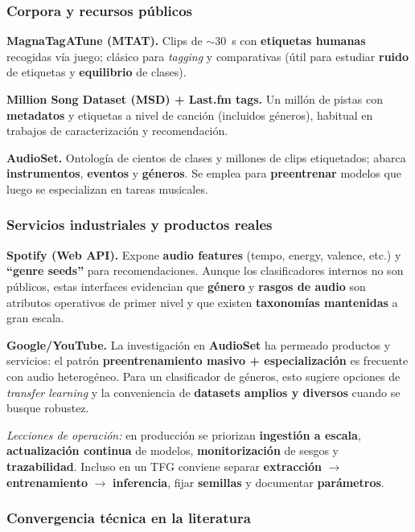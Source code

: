 \documentclass[12pt,twoside]{article}
\begin{document}
\subsubsection{Corpora y recursos públicos}

\textbf{MagnaTagATune (MTAT).} Clips de $\sim$30~s con \textbf{etiquetas humanas} recogidas vía juego; clásico para \emph{tagging} y comparativas (útil para estudiar \textbf{ruido} de etiquetas y \textbf{equilibrio} de clases).

\textbf{Million Song Dataset (MSD) + Last.fm tags.} Un millón de pistas con \textbf{metadatos} y etiquetas a nivel de canción (incluidos géneros), habitual en trabajos de caracterización y recomendación.

\textbf{AudioSet.} Ontología de cientos de clases y millones de clips etiquetados; abarca \textbf{instrumentos}, \textbf{eventos} y \textbf{géneros}. Se emplea para \textbf{preentrenar} modelos que luego se especializan en tareas musicales.

\subsubsection{Servicios industriales y productos reales}

\textbf{Spotify (Web API).} Expone \textbf{audio features} (tempo, energy, valence, etc.) y \textbf{``genre seeds''} para recomendaciones. Aunque los clasificadores internos no son públicos, estas interfaces evidencian que \textbf{género} y \textbf{rasgos de audio} son atributos operativos de primer nivel y que existen \textbf{taxonomías mantenidas} a gran escala.

\textbf{Google/YouTube.} La investigación en \textbf{AudioSet} ha permeado productos y servicios: el patrón \textbf{preentrenamiento masivo + especialización} es frecuente con audio heterogéneo. Para un clasificador de géneros, esto sugiere opciones de \emph{transfer learning} y la conveniencia de \textbf{datasets amplios y diversos} cuando se busque robustez.

\medskip
\noindent\textit{Lecciones de operación:} en producción se priorizan \textbf{ingestión a escala}, \textbf{actualización continua} de modelos, \textbf{monitorización} de sesgos y \textbf{trazabilidad}. Incluso en un TFG conviene separar \textbf{extracción} $\to$ \textbf{entrenamiento} $\to$ \textbf{inferencia}, fijar \textbf{semillas} y documentar \textbf{parámetros}.

\subsubsection{Convergencia técnica en la literatura}
\end{document}
